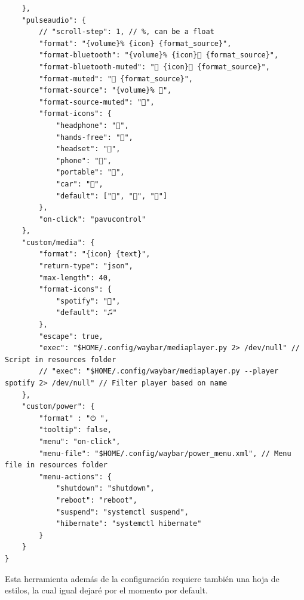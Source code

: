 \documentclass[11pt]{article}
\begin{document}
\begin{verbatim}
    },
    "pulseaudio": {
        // "scroll-step": 1, // %, can be a float
        "format": "{volume}% {icon} {format_source}",
        "format-bluetooth": "{volume}% {icon} {format_source}",
        "format-bluetooth-muted": " {icon} {format_source}",
        "format-muted": " {format_source}",
        "format-source": "{volume}% ",
        "format-source-muted": "",
        "format-icons": {
            "headphone": "",
            "hands-free": "",
            "headset": "",
            "phone": "",
            "portable": "",
            "car": "",
            "default": ["", "", ""]
        },
        "on-click": "pavucontrol"
    },
    "custom/media": {
        "format": "{icon} {text}",
        "return-type": "json",
        "max-length": 40,
        "format-icons": {
            "spotify": "",
            "default": "🎜"
        },
        "escape": true,
        "exec": "$HOME/.config/waybar/mediaplayer.py 2> /dev/null" // Script in resources folder
        // "exec": "$HOME/.config/waybar/mediaplayer.py --player spotify 2> /dev/null" // Filter player based on name
    },
    "custom/power": {
        "format" : "⏻ ",
		"tooltip": false,
		"menu": "on-click",
		"menu-file": "$HOME/.config/waybar/power_menu.xml", // Menu file in resources folder
		"menu-actions": {
			"shutdown": "shutdown",
			"reboot": "reboot",
			"suspend": "systemctl suspend",
			"hibernate": "systemctl hibernate"
		}
    }
}
\end{verbatim}

Esta herramienta además de la configuración requiere también una hoja de estilos, la cual igual dejaré por el momento por default.
\end{document}
